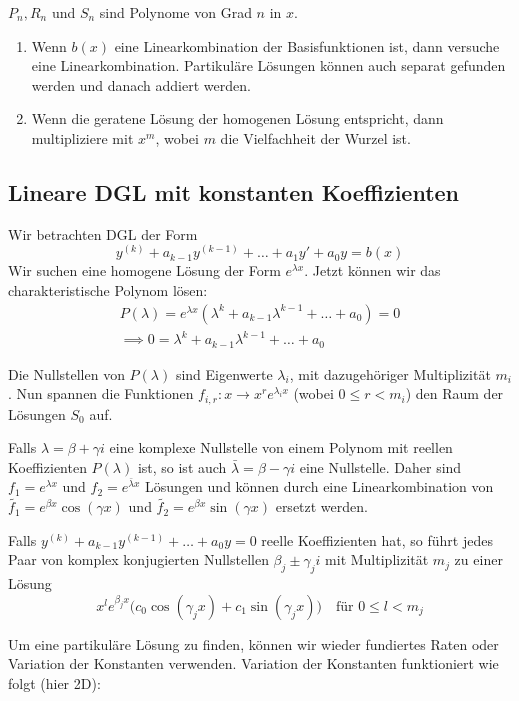 \documentclass[a4paper,10pt]{article}
\begin{document}
\(P_n, R_n \) und \(S_n\) sind Polynome von Grad $n$ in \(x\). 

\begin{enumerate}
  \item Wenn \(b(x)\) eine Linearkombination der Basisfunktionen ist, dann versuche eine Linearkombination. Partikuläre Lösungen können auch separat gefunden werden und danach addiert werden.
  \item Wenn die geratene Lösung der homogenen Lösung entspricht, dann multipliziere mit \(x^m\), wobei \(m\) die Vielfachheit der Wurzel ist.
\end{enumerate}

\subsection{Lineare DGL mit konstanten Koeffizienten}
Wir betrachten DGL der Form
\[y^{(k)} + a_{k-1} y^{(k-1)} + \ldots + a_1 y' + a_0 y = b(x)\]
Wir suchen eine homogene Lösung der Form \(e^{\lambda x}\). Jetzt können wir das charakteristische Polynom lösen:
\begin{align*}
  P(\lambda) = e^{\lambda x} \left(\lambda^k + a_{k-1}\lambda^{k-1} + \ldots + a_0\right) = 0 \\ 
  \implies 0 = \lambda^k + a_{k-1}\lambda^{k-1} + \ldots+ a_0
\end{align*}

Die Nullstellen von \(P(\lambda)\) sind Eigenwerte \(\lambda_i\), mit dazugehöriger Multiplizität \(m_i\). Nun spannen die Funktionen \(f_{i,r} : x \to x^r e^{\lambda_i x}\) (wobei $0 \leq r < m_i$) den Raum der Lösungen \(S_0\) auf.

Falls \(\lambda = \beta + \gamma i\) eine komplexe Nullstelle von einem Polynom mit reellen Koeffizienten \(P(\lambda)\) ist, so ist auch 
\(\bar{\lambda} = \beta - \gamma i\) eine Nullstelle. Daher sind \(f_1 = e^{\lambda x}\) und \(f_2 = e^{\bar{\lambda} x}\) Lösungen und können durch eine Linearkombination von \(\tilde{f_1} = e^{\beta x} \cos(\gamma x)\) und \(\tilde{f_2} = e^{\beta x} \sin(\gamma x)\) ersetzt werden.

Falls \(y^{(k)} + a_{k-1}y^{(k-1)} + \dots + a_0 y = 0\) reelle Koeffizienten hat, so führt jedes Paar von komplex konjugierten Nullstellen $\beta_j \pm \gamma_j i$ mit Multiplizität $m_j$ zu einer Lösung
\[x^l e^{\beta_j x} \Big( c_0 \cos(\gamma_j x) + c_1 \sin(\gamma_j x) \Big) \quad \text{für }0 \leq l < m_j\]

Um eine partikuläre Lösung zu finden, können wir wieder fundiertes Raten oder Variation der Konstanten verwenden. 
Variation der Konstanten funktioniert wie folgt (hier 2D):
\end{document}

